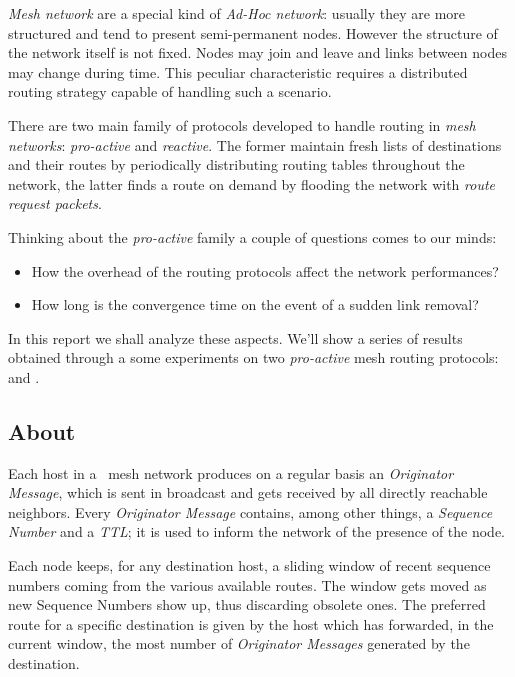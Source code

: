 \emph{Mesh network} are a special kind of \emph{Ad-Hoc network}:
usually they are more structured and tend to present semi-permanent
nodes. However the structure of the network itself is not fixed. Nodes
may join and leave and links between nodes may change during
time. This peculiar characteristic requires a distributed routing
strategy capable of handling such a scenario.

There are two main family of protocols developed to handle routing in
\emph{mesh networks}: \emph{pro-active} and \emph{reactive}.
The former maintain fresh lists of destinations and their routes by
periodically distributing routing tables throughout the network, the
latter finds a route on demand by flooding the network with \emph{route
request packets}.

Thinking about the \emph{pro-active} family a couple of questions
comes to our minds:
\begin{itemize}
\item   How the overhead of the routing protocols affect the network
        performances?
\item   How long is the convergence time on the event of a sudden link
        removal?
\end{itemize}

In this report we shall analyze these aspects. We'll show a series of
results obtained through a some experiments on two \emph{pro-active} mesh
routing protocols: \batman\cite{bib:BATMAN} and \olsr\cite{bib:OLSR}.

\subsection{About \batman}

    Each host in a \batman\ mesh network produces on a
    regular basis an \emph{Originator Message}, which is sent in
    broadcast and gets received by all directly reachable neighbors. Every
    \emph{Originator Message} contains, among other things, a
    \emph{Sequence Number} and a \emph{TTL}; it is used to
    inform the network of the presence of the node.

    Each node keeps, for any destination host, a sliding window of
    recent sequence numbers coming from the various available routes. The
    window gets moved as new Sequence Numbers show up, thus discarding
    obsolete ones. The preferred
    route for a specific destination is given by the host which has
    forwarded, in the current window,  the most number of \emph{Originator
    Messages} generated by the destination.

